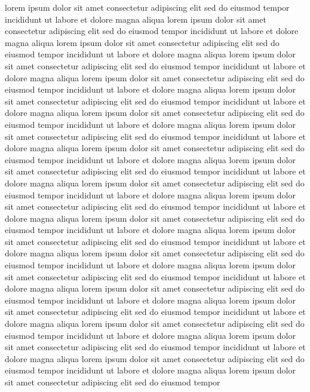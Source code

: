 \documentclass{article}
\begin{document}
\tiny
lorem ipsum dolor sit amet consectetur adipiscing elit sed do eiusmod tempor
incididunt ut labore et dolore magna aliqua lorem ipsum dolor sit amet
consectetur adipiscing elit sed do eiusmod tempor incididunt ut labore et
dolore magna aliqua lorem ipsum dolor sit amet consectetur adipiscing elit
sed do eiusmod tempor incididunt ut labore et dolore magna aliqua lorem
ipsum dolor sit amet consectetur adipiscing elit sed do eiusmod tempor
incididunt ut labore et dolore magna aliqua lorem ipsum dolor sit amet
consectetur adipiscing elit sed do eiusmod tempor incididunt ut labore et
dolore magna aliqua lorem ipsum dolor sit amet consectetur adipiscing elit
sed do eiusmod tempor incididunt ut labore et dolore magna aliqua lorem
ipsum dolor sit amet consectetur adipiscing elit sed do eiusmod tempor
incididunt ut labore et dolore magna aliqua lorem ipsum dolor sit amet
consectetur adipiscing elit sed do eiusmod tempor incididunt ut labore et
dolore magna aliqua lorem ipsum dolor sit amet consectetur adipiscing elit
sed do eiusmod tempor incididunt ut labore et dolore magna aliqua lorem
ipsum dolor sit amet consectetur adipiscing elit sed do eiusmod tempor
incididunt ut labore et dolore magna aliqua lorem ipsum dolor sit amet
consectetur adipiscing elit sed do eiusmod tempor incididunt ut labore et
dolore magna aliqua lorem ipsum dolor sit amet consectetur adipiscing elit
sed do eiusmod tempor incididunt ut labore et dolore magna aliqua lorem
ipsum dolor sit amet consectetur adipiscing elit sed do eiusmod tempor
incididunt ut labore et dolore magna aliqua lorem ipsum dolor sit amet
consectetur adipiscing elit sed do eiusmod tempor incididunt ut labore et
dolore magna aliqua lorem ipsum dolor sit amet consectetur adipiscing elit
sed do eiusmod tempor incididunt ut labore et dolore magna aliqua lorem
ipsum dolor sit amet consectetur adipiscing elit sed do eiusmod tempor
incididunt ut labore et dolore magna aliqua lorem ipsum dolor sit amet
consectetur adipiscing elit sed do eiusmod tempor incididunt ut labore et
dolore magna aliqua lorem ipsum dolor sit amet consectetur adipiscing elit
sed do eiusmod tempor incididunt ut labore et dolore magna aliqua lorem
ipsum dolor sit amet consectetur adipiscing elit sed do eiusmod tempor
incididunt ut labore et dolore magna aliqua lorem ipsum dolor sit amet
consectetur adipiscing elit sed do eiusmod tempor incididunt ut labore et
dolore magna aliqua lorem ipsum dolor sit amet consectetur adipiscing elit
sed do eiusmod tempor incididunt ut labore et dolore magna aliqua lorem
ipsum dolor sit amet consectetur adipiscing elit sed do eiusmod tempor
\end{document}
